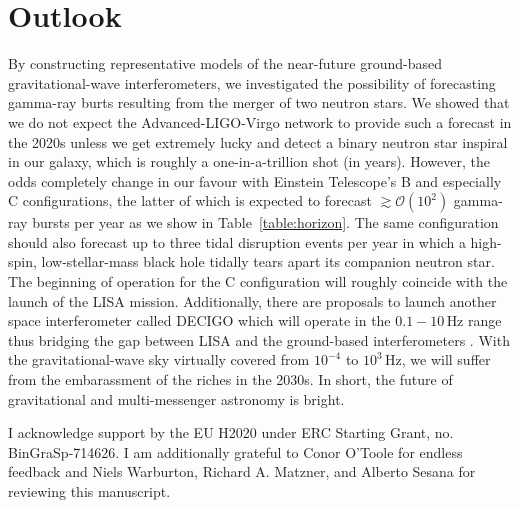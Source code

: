 \documentclass[prd,amsmath,amssymb,aps,floats,amsfonts,notitlepage,superscriptaddress,eqsecnum,nofootinbib,10pt]{revtex4-1}
\newcommand{\ord}{\mathcal{O}}
\begin{document}
\section{Outlook}
By constructing representative models of the near-future ground-based gravitational-wave interferometers, we investigated the possibility of
forecasting gamma-ray burts resulting from the merger of two neutron stars.
We showed that we do not expect the Advanced-LIGO-Virgo network to provide such a forecast in the 2020s unless we get extremely lucky
and detect a binary neutron star inspiral in our galaxy, which is roughly a one-in-a-trillion shot (in years). %
However, the odds completely change in our favour with Einstein Telescope's B and especially C configurations, 
the latter of which is expected to forecast $\gtrsim \ord(10^2)$ gamma-ray bursts per year as we show in Table~\ref{table:horizon}. 
The same configuration should also forecast up to three tidal disruption events per year in which a high-spin, low-stellar-mass
black hole tidally tears apart its companion neutron star.
The beginning of operation for the C configuration will roughly coincide with the launch of the LISA mission.
Additionally, there are proposals to launch another space interferometer called DECIGO which will operate
in the $0.1 - 10\,$Hz range thus bridging the gap between LISA and the ground-based interferometers \cite{Sato:2009zzb, Kawamura:2006zz}.
With the gravitational-wave sky virtually covered from $10^{-4}$ to $10^3\,$Hz, we will suffer from the 
embarassment of the riches in the 2030s. In short, the future of gravitational and multi-messenger astronomy is bright.


\acknowledgements 
I acknowledge support by the EU H2020 under ERC Starting Grant, no. BinGraSp-714626.
I am additionally grateful to Conor O'Toole for endless feedback and Niels Warburton, Richard A. Matzner, and Alberto Sesana for reviewing this manuscript.

 
 

%


 
 
 
 
 
 
 
\end{document}
